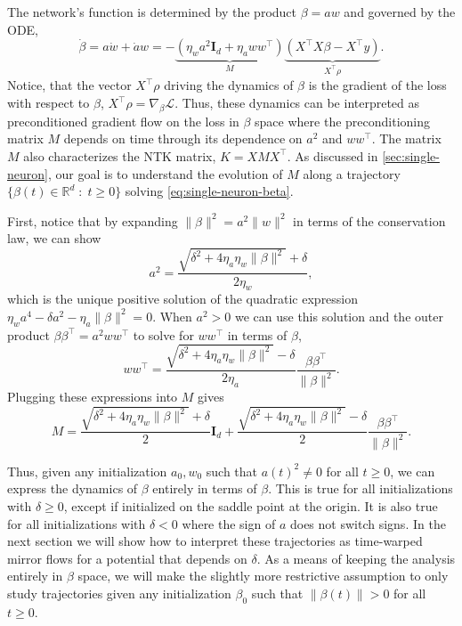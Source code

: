 \documentclass{article}
\theoremstyle{plain}
\theoremstyle{definition}
\theoremstyle{remark}
\begin{document}
The network's function is determined by the product $\beta = aw$ and governed by the ODE,
\begin{equation}
    \label{eq:single-neuron-beta}
    \dot{\beta} = a \dot{w} + \dot{a} w = -\underbrace{\left(\eta_w a^2\mathbf{I}_d + \eta_a w w^\intercal\right)}_{M} \underbrace{\left(X^\intercal X \beta - X^\intercal y\right)}_{X^\intercal \rho}.
\end{equation}
Notice, that the vector $X^\intercal \rho$ driving the dynamics of $\beta$ is the gradient of the loss with respect to $\beta$, $X^\intercal \rho = \nabla_\beta \mathcal{L}$.
%
Thus, these dynamics can be interpreted as preconditioned gradient flow on the loss in $\beta$ space where the preconditioning matrix $M$ depends on time through its dependence on $a^2$ and $ww^\intercal$.
%
The matrix $M$ also characterizes the NTK matrix, $K = XMX^\intercal$.
%
As discussed in \cref{sec:single-neuron}, our goal is to understand the evolution of $M$ along a trajectory $\{\beta(t) \in \mathbb{R}^d \;:\; t \ge 0 \}$ solving \cref{eq:single-neuron-beta}.


First, notice that by expanding $\|\beta\|^2 = a^2\|w\|^2$ in terms of the conservation law, we can show
\begin{equation}
    a^2 = \frac{\sqrt{\delta^2 + 4\eta_a\eta_w\|\beta\|^2} + \delta}{2\eta_w},
\end{equation}
which is the unique positive solution of the quadratic expression $\eta_wa^4 - \delta a^2 - \eta_a\|\beta\|^2 = 0$.
%
When $a^2 > 0$ we can use this solution and the outer product $\beta\beta^\intercal = a^2 ww^\intercal$ to solve for $ww^\intercal$ in terms of $\beta$,
\begin{equation}
    ww^\intercal = \frac{\sqrt{\delta^2 + 4\eta_a\eta_w\|\beta\|^2} - \delta}{2\eta_a}\frac{\beta\beta^\intercal}{\|\beta\|^2}.
\end{equation}
Plugging these expressions into $M$ gives
\begin{equation}
    M = \frac{\sqrt{\delta^2 + 4\eta_a\eta_w\|\beta\|^2} + \delta}{2}\mathbf{I}_d + \frac{\sqrt{\delta^2 + 4\eta_a\eta_w\|\beta\|^2} - \delta}{2}\frac{\beta\beta^\intercal}{\|\beta\|^2}.
\end{equation}

Thus, given any initialization $a_0, w_0$ such that $a(t)^2 \neq 0$ for all $t \ge 0$, we can express the dynamics of $\beta$ entirely in terms of $\beta$.
%
This is true for all initializations with $\delta \ge 0$, except if initialized on the saddle point at the origin.
%
It is also true for all initializations with $\delta < 0$ where the sign of $a$ does not switch signs.
%
In the next section we will show how to interpret these trajectories as time-warped mirror flows for a potential that depends on $\delta$.
%
As a means of keeping the analysis entirely in $\beta$ space, we will make the slightly more restrictive assumption to only study trajectories given any initialization $\beta_0$ such that $\|\beta (t)\| > 0$ for all $t \ge 0$.
\end{document}
